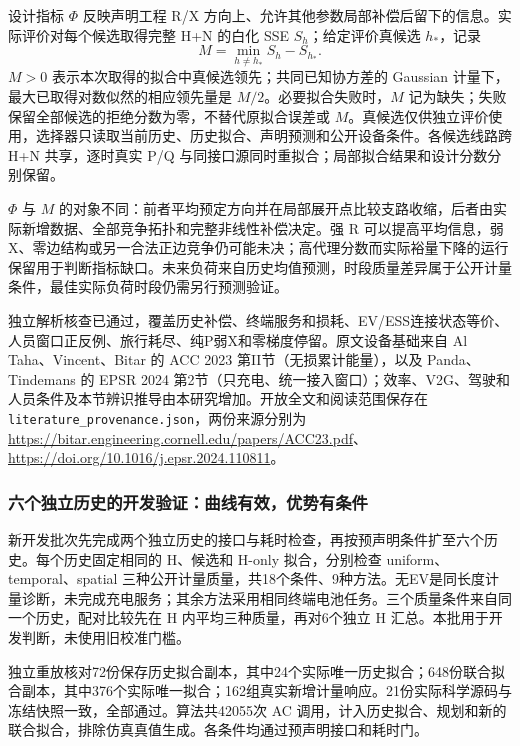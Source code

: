 设计指标 $\Phi$ 反映声明工程 R/X 方向上、允许其他参数局部补偿后留下的信息。实际评价对每个候选取得完整 H+N 的白化 SSE $S_h$；给定评价真候选 $h_*$，记录
\begin{equation}
 \boxed{M=\min_{h\ne h_*}S_h-S_{h_*}.}
 \label{evf:actual-margin}
\end{equation}
$M>0$ 表示本次取得的拟合中真候选领先；共同已知协方差的 Gaussian 计量下，最大已取得对数似然的相应领先量是 $M/2$。必要拟合失败时，$M$ 记为缺失；失败保留全部候选的拒绝分数为零，不替代原拟合误差或 $M$。真候选仅供独立评价使用，选择器只读取当前历史、历史拟合、声明预测和公开设备条件。各候选线路跨 H+N 共享，逐时真实 P/Q 与同接口源同时重拟合；局部拟合结果和设计分数分别保留。

$\Phi$ 与 $M$ 的对象不同：前者平均预定方向并在局部展开点比较支路收缩，后者由实际新增数据、全部竞争拓扑和完整非线性补偿决定。强 R 可以提高平均信息，弱 X、零边结构或另一合法正边竞争仍可能未决；高代理分数而实际裕量下降的运行保留用于判断指标缺口。未来负荷来自历史均值预测，时段质量差异属于公开计量条件，最佳实际负荷时段仍需另行预测验证。

独立解析核查已通过，覆盖历史补偿、终端服务和损耗、EV/ESS连接状态等价、人员窗口正反例、旅行耗尽、纯P弱X和零梯度停留。原文设备基础来自 Al Taha、Vincent、Bitar 的 ACC 2023 第II节（无损累计能量），以及 Panda、Tindemans 的 EPSR 2024 第2节（只充电、统一接入窗口）；效率、V2G、驾驶和人员条件及本节辨识推导由本研究增加。开放全文和阅读范围保存在 \texttt{literature\_provenance.json}，两份来源分别为
\url{https://bitar.engineering.cornell.edu/papers/ACC23.pdf}、
\url{https://doi.org/10.1016/j.epsr.2024.110811}。
\subsubsection{六个独立历史的开发验证：曲线有效，优势有条件}

新开发批次先完成两个独立历史的接口与耗时检查，再按预声明条件扩至六个历史。每个历史固定相同的 H、候选和 H-only 拟合，分别检查 uniform、temporal、spatial 三种公开计量质量，共18个条件、9种方法。无EV是同长度计量诊断，未完成充电服务；其余方法采用相同终端电池任务。三个质量条件来自同一个历史，配对比较先在 H 内平均三种质量，再对6个独立 H 汇总。本批用于开发判断，未使用旧校准门槛。

独立重放核对72份保存历史拟合副本，其中24个实际唯一历史拟合；648份联合拟合副本，其中376个实际唯一拟合；162组真实新增计量响应。21份实际科学源码与冻结快照一致，全部通过。算法共42055次 AC 调用，计入历史拟合、规划和新的联合拟合，排除仿真真值生成。各条件均通过预声明接口和耗时门。

